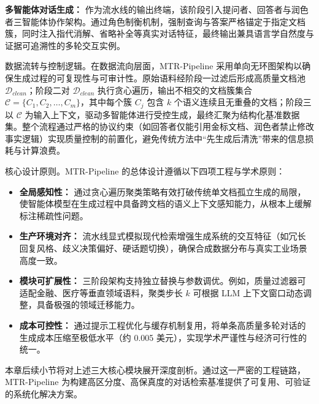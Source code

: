 \textbf{多智能体对话生成：} 作为流水线的输出终端，该阶段引入提问者、回答者与润色者三智能体协作架构。通过角色制衡机制，强制查询与答案严格锚定于指定文档簇，同时注入指代消解、省略补全等真实对话特征，最终输出兼具语言学自然度与证据可追溯性的多轮交互实例。




数据流转与控制逻辑。在数据流向层面，MTR-Pipeline 采用单向无环图架构以确保生成过程的可复现性与可审计性。原始语料经阶段一过滤后形成高质量文档池 $\mathcal{D}_{clean}$；阶段二对 $\mathcal{D}_{clean}$ 执行贪心遍历，输出不相交的文档簇集合 $\mathcal{C} = \{C_1, C_2, \dots, C_m\}$，其中每个簇 $C_j$ 包含 $k$ 个语义连续且无重叠的文档；阶段三以 $\mathcal{C}$ 为输入上下文，驱动多智能体进行受控生成，最终汇聚为结构化基准数据集。整个流程通过严格的协议约束（如回答者仅能引用金标文档、润色者禁止修改事实逻辑）实现质量控制的前置化，避免传统方法中“先生成后清洗”带来的信息损耗与计算浪费。



核心设计原则。MTR-Pipeline 的总体设计遵循以下四项工程与学术原则：

\begin{itemize}

    \item \textbf{全局感知性：} 通过贪心遍历聚类策略有效打破传统单文档孤立生成的局限，使智能体模型在生成过程中具备跨文档的语义上下文感知能力，从根本上缓解标注稀疏性问题。

    \item \textbf{生产环境对齐：} 流水线显式模拟现代检索增强生成系统的交互特征（如冗长回复风格、歧义决策偏好、硬话题切换），确保合成数据分布与真实工业场景高度一致。

    \item \textbf{模块可扩展性：} 三阶段架构支持独立替换与参数调优。例如，质量过滤器可适配金融、医疗等垂直领域语料，聚类步长 $k$ 可根据 LLM 上下文窗口动态调整，具备极强的领域迁移能力。

    \item \textbf{成本可控性：} 通过提示工程优化与缓存机制复用，将单条高质量多轮对话的生成成本压缩至极低水平（约 0.005 美元），实现学术严谨性与经济可行性的统一。

\end{itemize}



本章后续小节将对上述三大核心模块展开深度剖析。通过这一严密的工程链路，MTR-Pipeline 为构建高区分度、高保真度的对话检索基准提供了可复用、可验证的系统化解决方案。





